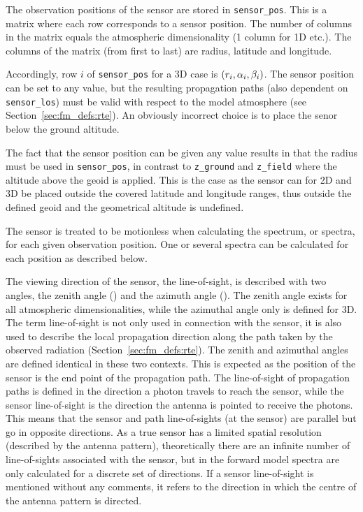 \label{sec:fm_defs:sensorpos}

The observation positions of the sensor are stored in
\verb|sensor_pos|. This is a matrix where each row corresponds to a
sensor position. The number of columns in the matrix equals the
atmospheric dimensionality (1 column for 1D etc.). The columns of the
matrix (from first to last) are radius, latitude and longitude. 

Accordingly, row $i$ of \verb|sensor_pos| for a 3D case is
$(r_{i},\alpha_{i},\beta_{i})$. The sensor position can be set to any
value, but the resulting propagation paths (also dependent on
\verb|sensor_los|) must be valid with respect to the model atmosphere
(see Section~\ref{sec:fm_defs:rte}). An obviously incorrect choice is to
place the senor below the ground altitude.

The fact that the sensor position can be given any value results in
that the radius must be used in \verb|sensor_pos|, in contrast to
\verb|z_ground| and \verb|z_field| where the altitude above the geoid
is applied. This is the case as the sensor can for 2D and 3D be
placed outside the covered latitude and longitude ranges, thus
outside the defined geoid and the geometrical altitude is undefined.

The sensor is treated to be motionless when calculating the spectrum,
or spectra, for each given observation position. One or several
spectra can be calculated for each position as described below.


\label{sec:fm_defs:los}

The viewing direction of the sensor, the line-of-sight, is described
with two angles, the zenith angle (\ZntAng) and the azimuth angle
(\AzmAng). The zenith angle exists for all atmospheric
dimensionalities, while the azimuthal angle only is defined for 3D.
The term line-of-sight is not only used in connection with the sensor,
it is also used to describe the local propagation direction along the
path taken by the observed radiation (Section~\ref{sec:fm_defs:rte}).
The zenith and azimuthal angles are defined identical in these two
contexts. This is expected as the position of the sensor is the end
point of the propagation path. The line-of-sight of propagation paths
is defined in the direction a photon travels to reach the sensor,
while the sensor line-of-sight is the direction the antenna is pointed
to receive the photons. This means that the sensor and path
line-of-sights (at the sensor) are parallel but go in opposite
directions. As a true sensor has a limited spatial resolution
(described by the antenna pattern), theoretically there are an
infinite number of line-of-sights associated with the sensor, but in
the forward model spectra are only calculated for a discrete set of
directions. If a sensor line-of-sight is mentioned without any
comments, it refers to the direction in which the centre of the
antenna pattern is directed.

